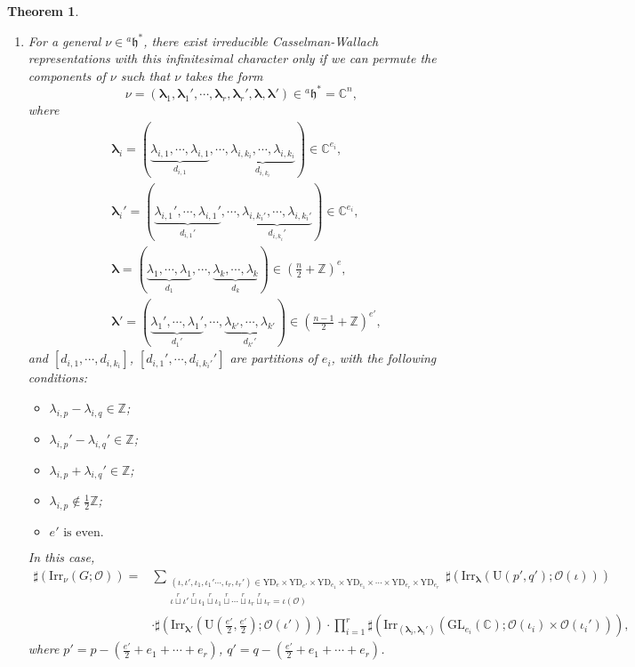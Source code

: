 \documentclass[12pt, a4paper]{amsart}
\numberwithin{equation}{section}
\newtheorem{thm}{Theorem}[section]
\newcommand{\blam}{{\boldsymbol{\lambda}}}
\newcommand{\BC}{{\mathbb {C}}}
\newcommand{\BZ}{{\mathbb {Z}}}
\newcommand{\CO}{{\mathcal {O}}}
\newcommand{\fh}{\mathfrak{h}}
\newcommand{\GL}{{\mathrm{GL}}}
\newcommand{\U}{{\mathrm{U}}}
\newcommand{\Irr}{{\mathrm{Irr}}}
\begin{document}
\begin{thm}
\begin{enumerate}
        \item For a general $\nu \in {^{a}\fh^*}$, there exist irreducible Casselman-Wallach representations with this infinitesimal character only if we can permute the components of $\nu$ such that $\nu$ takes the form
        \[
            \nu = (\blam_1, \blam_1', \cdots, \blam_r, \blam_r', \blam, \blam') \in {^{a}\fh}^* = \BC^n,
        \]
        where 
        \begin{align} 
            &\blam_i = (\underbrace{\lambda_{i,1}, \cdots, \lambda_{i,1}}_{d_{i,1}}, \cdots, \underbrace{\lambda_{i,k_i}, \cdots, \lambda_{i,k_i}}_{d_{i,k_i}}) \in \BC^{e_i},\\
            &\blam_i' = (\underbrace{\lambda_{i,1}', \cdots, \lambda_{i,1}'}_{d_{i,1}'}, \cdots, \underbrace{\lambda_{i,k_i'}, \cdots, \lambda_{i,k_i'}}_{d_{i,k_i}'}) \in \BC^{e_i},\\
            &\blam = (\underbrace{\lambda_1, \cdots, \lambda_1}_{d_1}, \cdots, \underbrace{\lambda_k, \cdots, \lambda_k}_{d_k}) \in \left(\frac{n}{2} + \BZ\right)^{e},\\
            &\blam' = (\underbrace{\lambda_1', \cdots, \lambda_1'}_{d_1'}, \cdots, \underbrace{\lambda_{k'}, \cdots, \lambda_{k'}}_{d_{k'}'}) \in \left(\frac{n-1}{2} + \BZ\right)^{e'},
        \end{align}
        and $[d_{i,1}, \cdots, d_{i,k_i}]$, $[d_{i,1}', \cdots, d_{i,k_i'}']$ are partitions of $e_i$, with the following conditions: 
        \begin{itemize}
            \item $\lambda_{i,p} - \lambda_{i,q} \in \BZ$;
            \item $\lambda_{i,p}' - \lambda_{i,q}' \in \BZ$;
            \item $\lambda_{i,p} + \lambda_{i,q}' \in \BZ$;
            \item $\lambda_{i,p} \notin \frac{1}{2}\BZ$;
            \item $e' \text{ is even.}$
        \end{itemize}
        In this case, 
        \begin{align*}
            \sharp(\Irr_{\nu}(G;\CO)) = & \sum_{\substack{(\iota, \iota', \iota_1,\iota_1' \cdots,\iota_r, \iota_r') \in \mathrm{YD}_{e} \times \mathrm{YD}_{e'} \times \mathrm{YD}_{e_1} \times \mathrm{YD}_{e_1} \times \cdots \times \mathrm{YD}_{e_r} \times \mathrm{YD}_{e_r} \\ \iota \mathop{\sqcup}\limits^r \iota' \mathop{\sqcup}\limits^r \iota_1 \mathop{\sqcup}\limits^r \iota_1 \mathop{\sqcup}\limits^r \cdots  \mathop{\sqcup}\limits^r \iota_r \mathop{\sqcup}\limits^r \iota_r = \iota(\CO)}} \sharp(\Irr_{\blam}(\U(p',q');\CO(\iota)))\\
            & \cdot \sharp(\Irr_{\blam'}(\U(\frac{e'}{2},\frac{e'}{2});\CO(\iota')))\cdot \prod_{i=1}^{r} \sharp(\Irr_{(\blam_i,\blam_i')}(\GL_{e_i}(\BC);\CO(\iota_i)\times \CO(\iota_i'))),
        \end{align*}
        where $p' = p - (\frac{e'}{2} + e_1 + \cdots + e_r) $, $q' = q - (\frac{e'}{2} + e_1 + \cdots + e_r)$.
    \end{enumerate}
\end{thm}
\end{document}

